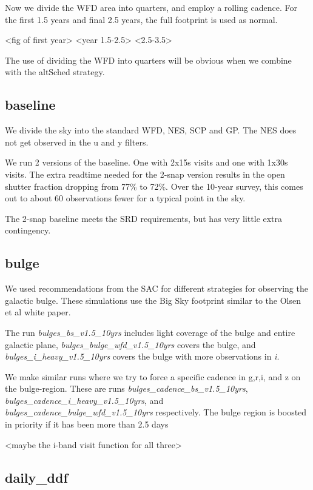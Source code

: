Now we divide the WFD area into quarters, and employ a rolling cadence. For the first 1.5 years and final 2.5 years, the full footprint is used as normal. 

<fig of first year> <year 1.5-2.5> <2.5-3.5>

The use of dividing the WFD into quarters will be obvious when we combine with the altSched strategy.


\subsection{baseline}

We divide the sky into the standard WFD, NES, SCP and GP. The NES does not get observed in the u and y filters. 

We run 2 versions of the baseline. One with 2x15s visits and one with 1x30s visits. The extra readtime needed for the 2-snap version results in the open shutter fraction dropping from 77\% to 72\%. Over the 10-year survey, this comes out to about 60 observations fewer for a typical point in the sky. 

The 2-snap baseline meets the SRD requirements, but has very little extra contingency.

\subsection{bulge}

We used recommendations from the SAC for different strategies for observing the galactic bulge. These simulations use the Big Sky footprint similar to the Olsen et al white paper.  

The run \emph{bulges\_bs\_v1.5\_10yrs} includes light coverage of the bulge and entire galactic plane, \emph{bulges\_bulge\_wfd\_v1.5\_10yrs} covers the bulge, and \emph{bulges\_i\_heavy\_v1.5\_10yrs} covers the bulge with more observations in \emph{i}. 

We make similar runs where we try to force a specific cadence in g,r,i, and z on the bulge-region. These are runs \emph{bulges\_cadence\_bs\_v1.5\_10yrs}, \emph{bulges\_cadence\_i\_heavy\_v1.5\_10yrs}, and \emph{bulges\_cadence\_bulge\_wfd\_v1.5\_10yrs} respectively. The bulge region is boosted in priority if it has been more than 2.5 days 

<maybe the i-band visit function for all three>


\subsection{daily\_ddf}

